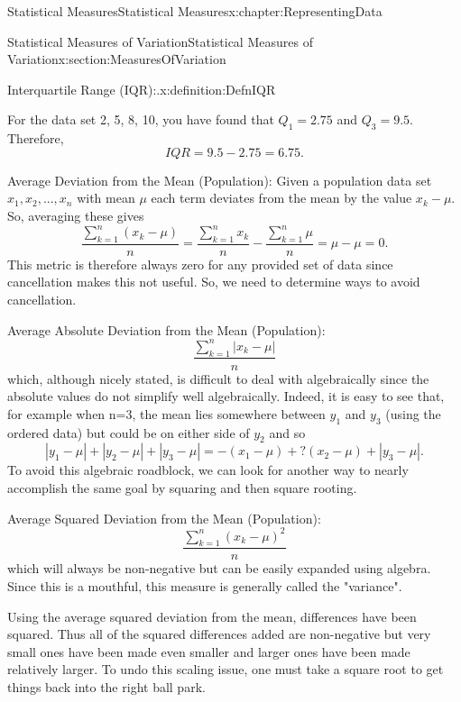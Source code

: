 \documentclass[oneside,10pt,]{book}
\numberwithin{equation}{section}
\begin{document}
\begin{chapterptx}{Statistical Measures}{}{Statistical Measures}{}{}{x:chapter:RepresentingData}
\begin{sectionptx}{Statistical Measures of Variation}{}{Statistical Measures of Variation}{}{}{x:section:MeasuresOfVariation}
\begin{definition}{Interquartile Range (IQR):.}{x:definition:DefnIQR}
%
\end{definition}
%
\par
For the data set \textbraceleft{}2, 5, 8, 10\textbraceright{}, you have found that \(Q_1 = 2.75\) and \(Q_3 = 9.5\). Therefore,%
\begin{equation*}
IQR = 9.5 - 2.75 = 6.75.
\end{equation*}
%
\par
Average Deviation from the Mean (Population):  Given a population data set \(x_1, x_2, ... , x_n\) with mean \(\mu\) each term deviates from the mean by the value \(x_k - \mu\). So, averaging these gives%
\begin{equation*}
\frac{\sum_{k=1}^n (x_k-\mu)}{n} = \frac{\sum_{k=1}^n x_k}{n} - \frac{\sum_{k=1}^n \mu}{n} = \mu - \mu = 0.
\end{equation*}
This metric is therefore always zero for any provided set of data since cancellation makes this not useful. So, we need to determine ways to avoid cancellation.%
\par
Average Absolute Deviation from the Mean (Population):%
\begin{equation*}
\frac{\sum_{k=1}^n \left | x_k-\mu \right |}{n} 
\end{equation*}
which, although nicely stated, is difficult to deal with algebraically since the absolute values do not simplify well algebraically. Indeed, it is easy to see that, for example when n=3, the mean lies somewhere between \(y_1\) and \(y_3\) (using the ordered data) but could be on either side of \(y_2\) and so%
\begin{equation*}
|y_1-\mu| + |y_2 - \mu| + |y_3 - \mu| = -(x_1-\mu) + ?(x_2 - \mu) + |y_3 - \mu|.
\end{equation*}
To avoid this algebraic roadblock, we can look for another way to nearly accomplish the same goal by squaring and then square rooting.%
\par
Average Squared Deviation from the Mean (Population):%
\begin{equation*}
\frac{\sum_{k=1}^n ( x_k-\mu )^2}{n} 
\end{equation*}
which will always be non-negative but can be easily expanded using algebra. Since this is a mouthful, this measure is generally called the "variance".%
\par
Using the average squared deviation from the mean, differences have been squared. Thus all of the squared differences added are non-negative but very small ones have been made even smaller and larger ones have been made relatively larger. To undo this scaling issue, one must take a square root to get things back into the right ball park.%

\end{sectionptx}
\end{chapterptx}
\end{document}
